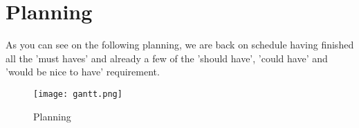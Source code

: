 \section{Planning}

As you can see on the following planning, we are back on schedule having finished all the 'must haves' and already a few of the 'should have', 'could have' and 'would be nice to have' requirement. \newline

\begin{figure}[!ht]
	\centering
	\texttt{[image: gantt.png]}
	\caption{Planning}
	\label{fig:length_eight_mouse}
\end{figure}
\FloatBarrier